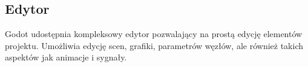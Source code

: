 \subsection{Edytor}
Godot udostępnia kompleksowy edytor pozwalający na prostą edycję elementów projektu. Umożliwia edycję scen, grafiki, parametrów węzłów, ale również takich aspektów jak animacje i sygnały.





